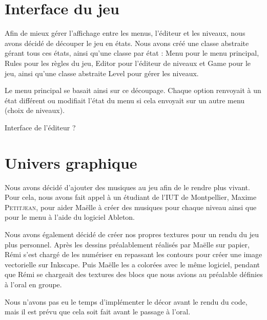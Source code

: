 \section{Interface du jeu}

Afin de mieux gérer l'affichage entre les menus, l'éditeur et les
niveaux, nous avons décidé de découper le jeu en états. Nous avons
créé une classe abstraite gérant tous ces états, ainsi qu'une
classe par état : Menu pour le menu principal, Rules pour les
règles du jeu, Editor pour l'éditeur de niveaux et Game pour
le jeu, ainsi qu'une classe abstraite Level pour gérer les niveaux.

Le menu principal se basait ainsi sur ce découpage. Chaque option
renvoyait à un état différent ou modifiait l'état du menu si cela
envoyait sur un autre menu (choix de niveaux).

Interface de l'éditeur ?

\section{Univers graphique}

Nous avons décidé d'ajouter des musiques au jeu afin de le rendre
plus vivant. Pour cela, nous avons fait appel à un étudiant de
l'IUT de Montpellier, Maxime \textsc{Petitjean}, pour aider Maëlle
à créer des musiques pour chaque niveau ainsi que pour le menu
à l'aide du logiciel Ableton.

Nous avons également décidé de créer nos propres textures pour un
rendu du jeu plus personnel. Après les dessins préalablement
réalisés par Maëlle sur papier, Rémi s'est chargé de les numériser
en repassant les contours pour créer une image vectorielle sur
Inkscape. Puis Maëlle les a colorées avec le même logiciel,
pendant que Rémi se chargeait des textures des blocs que nous
avions au préalable définies à l'oral en groupe.

Nous n'avons pas eu le temps d'implémenter le décor avant le rendu
du code, mais il est prévu que cela soit fait avant le passage à l'oral.
